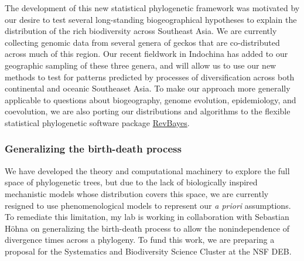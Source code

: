 The development of this new statistical phylogenetic framework was motivated by
our desire to test several long-standing biogeographical hypotheses to explain
the distribution of the rich biodiversity across Southeast Asia.
We are currently collecting genomic data from several genera of geckos that are
co-distributed across much of this region.
Our recent fieldwork in Indochina has added to our geographic sampling of these
three genera, and will allow us to use our new methods to test for patterns
predicted by processes of diversification across both continental and oceanic
Southeaset Asia.
To make our approach more generally applicable to questions about biogeography,
genome evolution, epidemiology, and coevolution,
we are also porting our distributions and algorithms to the flexible
statistical phylogenetic software package
\href{https://revbayes.github.io/}{RevBayes}.

\subsubsection*{Generalizing the birth-death process}
We have developed the theory and computational machinery to explore
the full space of phylogenetic trees, but due to the lack
of biologically inspired mechanistic models whose distribution covers
this space, we are currently resigned to use phenomenological models
to represent our \emph{a priori} assumptions.
To remediate this limitation, my lab is working in collaboration with Sebastian
H{\"o}hna on generalizing the birth-death process to allow the nonindependence
of divergence times across a phylogeny.
To fund this work, we are preparing a proposal for the Systematics and
Biodiversity Science Cluster at the NSF DEB. 

